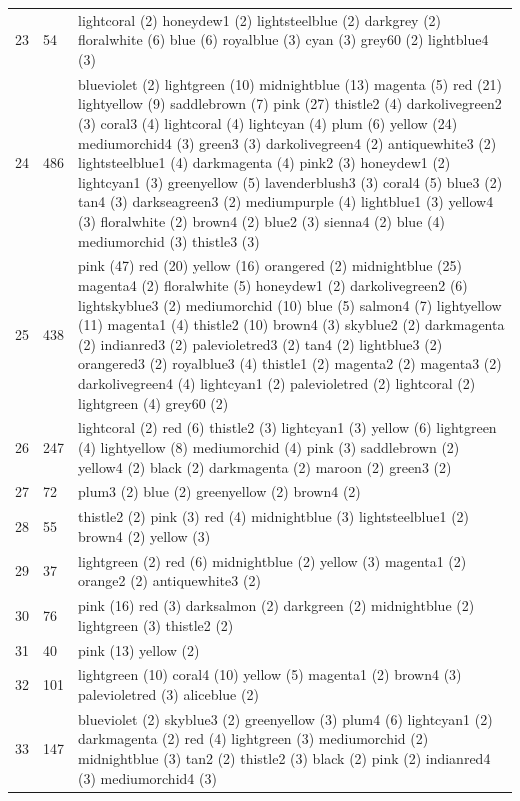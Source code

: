 \begin{landscape}
\begin{longtable}{|p{1.5cm}|p{1.25cm}|p{21cm}|}
23 & 54 & lightcoral (2) honeydew1 (2) lightsteelblue (2) darkgrey (2) floralwhite (6) blue (6) royalblue (3) cyan (3) grey60 (2) lightblue4 (3) \\
24 & 486 & blueviolet (2) lightgreen (10) midnightblue (13) magenta (5) red (21) lightyellow (9) saddlebrown (7) pink (27) thistle2 (4) darkolivegreen2 (3) coral3 (4) lightcoral (4) lightcyan (4) plum (6) yellow (24) mediumorchid4 (3) green3 (3) darkolivegreen4 (2) antiquewhite3 (2) lightsteelblue1 (4) darkmagenta (4) pink2 (3) honeydew1 (2) lightcyan1 (3) greenyellow (5) lavenderblush3 (3) coral4 (5) blue3 (2) tan4 (3) darkseagreen3 (2) mediumpurple (4) lightblue1 (3) yellow4 (3) floralwhite (2) brown4 (2) blue2 (3) sienna4 (2) blue (4) mediumorchid (3) thistle3 (3) \\
25 & 438 & pink (47) red (20) yellow (16) orangered (2) midnightblue (25) magenta4 (2) floralwhite (5) honeydew1 (2) darkolivegreen2 (6) lightskyblue3 (2) mediumorchid (10) blue (5) salmon4 (7) lightyellow (11) magenta1 (4) thistle2 (10) brown4 (3) skyblue2 (2) darkmagenta (2) indianred3 (2) palevioletred3 (2) tan4 (2) lightblue3 (2) orangered3 (2) royalblue3 (4) thistle1 (2) magenta2 (2) magenta3 (2) darkolivegreen4 (4) lightcyan1 (2) palevioletred (2) lightcoral (2) lightgreen (4) grey60 (2) \\
26 & 247 & lightcoral (2) red (6) thistle2 (3) lightcyan1 (3) yellow (6) lightgreen (4) lightyellow (8) mediumorchid (4) pink (3) saddlebrown (2) yellow4 (2) black (2) darkmagenta (2) maroon (2) green3 (2) \\
27 & 72 & plum3 (2) blue (2) greenyellow (2) brown4 (2) \\
28 & 55 & thistle2 (2) pink (3) red (4) midnightblue (3) lightsteelblue1 (2) brown4 (2) yellow (3) \\
29 & 37 & lightgreen (2) red (6) midnightblue (2) yellow (3) magenta1 (2) orange2 (2) antiquewhite3 (2) \\
30 & 76 & pink (16) red (3) darksalmon (2) darkgreen (2) midnightblue (2) lightgreen (3) thistle2 (2) \\
31 & 40 & pink (13) yellow (2) \\
32 & 101 & lightgreen (10) coral4 (10) yellow (5) magenta1 (2) brown4 (3) palevioletred (3) aliceblue (2) \\
33 & 147 & blueviolet (2) skyblue3 (2) greenyellow (3) plum4 (6) lightcyan1 (2) darkmagenta (2) red (4) lightgreen (3) mediumorchid (2) midnightblue (3) tan2 (2) thistle2 (3) black (2) pink (2) indianred4 (3) mediumorchid4 (3) \\

\end{longtable}
\end{landscape}
